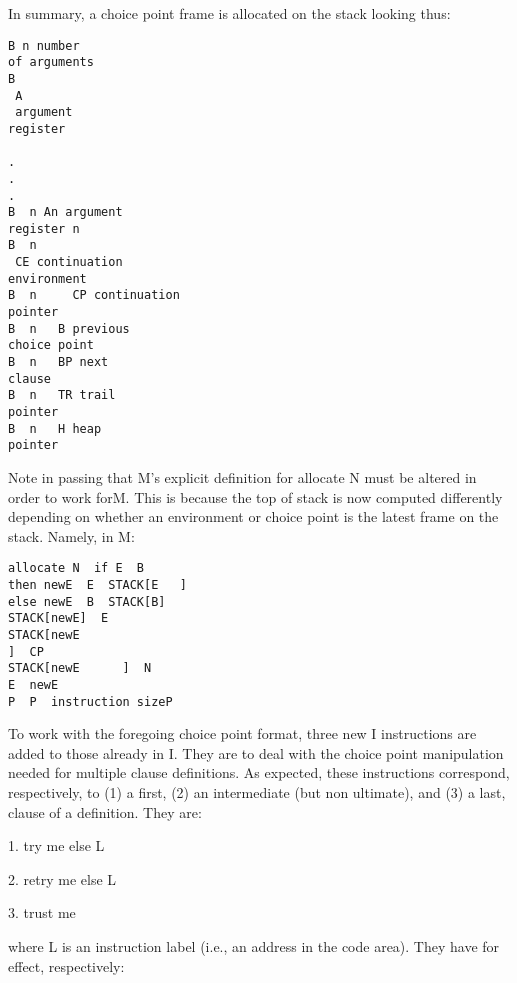 In summary, a choice point frame is allocated on the stack looking thus:
\begin{verbatim}
B n number
of arguments
B  
 A
 argument
register 

.
.
.
B  n An argument
register n
B  n  
 CE continuation
environment
B  n  	 CP continuation
pointer
B  n   B previous
choice point
B  n   BP next
clause
B  n   TR trail
pointer
B  n   H heap
pointer
\end{verbatim}

Note in passing that M’s explicit definition for allocate N must be altered in
order to work forM. This is because the top of stack is now computed differently
depending on whether an environment or choice point is the latest frame on the
stack. Namely, in M:
\begin{verbatim}
allocate N  if E  B
then newE  E  STACK[E  	]  
else newE  B  STACK[B]  
STACK[newE]  E
STACK[newE  
]  CP
STACK[newE  	]  N
E  newE
P  P  instruction sizeP
\end{verbatim}

To work with the foregoing choice point format, three new I instructions are
added to those already in I. They are to deal with the choice point manipulation
needed for multiple clause definitions. As expected, these instructions correspond,
respectively, to (1) a first, (2) an intermediate (but non ultimate), and (3) a last,
clause of a definition. They are:

1. try me else L

2. retry me else L

3. trust me

where L is an instruction label (i.e., an address in the code area). They have for
effect, respectively:

